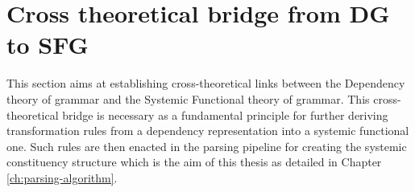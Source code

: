 
\section{Cross theoretical bridge from DG to SFG}
\label{sec:cross-theoretical-bridge}
    


%
    This section aims at establishing cross-theoretical links between the Dependency theory of grammar and the Systemic Functional theory of grammar. This cross-theoretical bridge is necessary as a fundamental principle for further deriving transformation rules from a dependency representation into a systemic functional one. Such rules are then enacted in the parsing pipeline for creating the systemic constituency structure which is the aim of this thesis as detailed in Chapter \ref{ch:parsing-algorithm}.

